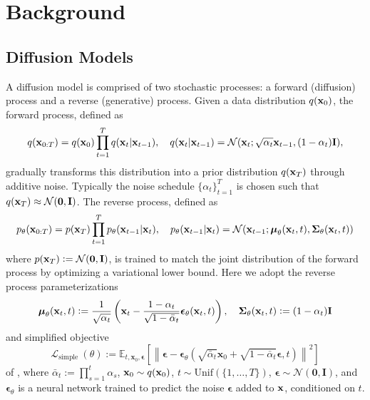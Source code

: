 \section{Background}
\subsection{Diffusion Models}
A diffusion model \citep{ddpm, sohldickstein} is comprised of two stochastic processes:  a forward (diffusion) process and a reverse (generative) process. Given a data distribution $q(\mathbf{x}_0)$, the forward process, defined as
\begin{equation}
q (\mathbf{x}_{0: T})=q(\mathbf{x}_0) \prod_{t=1}^T q (\mathbf{x}_t | \mathbf{x}_{t-1} ), \quad q (\mathbf{x}_t | \mathbf{x}_{t-1} )=\mathcal{N} (\mathbf{x}_t ; \sqrt{\alpha_t} \mathbf{x}_{t-1}, (1-\alpha_t) \mathbf{I} ),
\end{equation}
gradually transforms this distribution into a prior distribution $q(\mathbf{x}_T)$ through additive noise. Typically the noise schedule $\{\alpha_t\}_{t=1}^T$ is chosen such that $q(\mathbf{x}_T) \approx \mathcal{N}(\mathbf{0},\mathbf{I})$. The reverse process, defined as 
\begin{equation}
p_\theta (\mathbf{x}_{0: T} )=p (\mathbf{x}_T ) \prod_{t=1}^T p_\theta (\mathbf{x}_{t-1} | \mathbf{x}_t ), \quad p_\theta (\mathbf{x}_{t-1} | \mathbf{x}_t )=\mathcal{N} (\mathbf{x}_{t-1} ; \boldsymbol{\mu}_\theta (\mathbf{x}_t, t ), \boldsymbol{\Sigma}_\theta (\mathbf{x}_t, t ) )
\end{equation}
where $p(\mathbf{x}_T) \vcentcolon= \mathcal{N}(\mathbf{0},\mathbf{I})$, is trained to match the joint distribution of the forward process by optimizing a variational lower bound. Here we adopt the reverse process parameterizations
\begin{equation}
    \boldsymbol{\mu}_\theta (\mathbf{x}_t, t ) \vcentcolon= \frac{1}{\sqrt{\alpha_t}}\left(\mathbf{x}_t-\frac{1-\alpha_t}{\sqrt{1-\bar{\alpha}_t}} \boldsymbol{\epsilon}_\theta (\mathbf{x}_t, t)\right), \quad \boldsymbol{\Sigma}_\theta (\mathbf{x}_t, t ) \vcentcolon= (1-\alpha_t)\mathbf{I}
\end{equation}
and simplified objective
\begin{equation}
    \mathcal{L}_{\text {simple }}(\theta):=\mathbb{E}_{t, \mathbf{x}_0, \boldsymbol{\epsilon}}\left[\left\|\boldsymbol{\epsilon}-\boldsymbol{\epsilon}_\theta\left(\sqrt{\bar{\alpha}_t} \mathbf{x}_0+\sqrt{1-\bar{\alpha}_t} \boldsymbol{\epsilon}, t\right)\right\|^2\right]
    \label{eq:lsimple-ddpm}
\end{equation}
 of \citet{ddpm}, where $\bar{\alpha}_t:=\prod_{s=1}^t \alpha_s$, $\mathbf{x}_0 \sim q(\mathbf{x}_0)$, $t \sim \text{Unif}(\{1, \ldots, T\})$,  $\boldsymbol{\epsilon} \sim \mathcal{N}(\mathbf{0},\mathbf{I})$, and $\boldsymbol{\epsilon}_\theta$ is a neural network trained to predict the noise $\boldsymbol{\epsilon}$ added to $\mathbf{x}$, conditioned on $t$.
